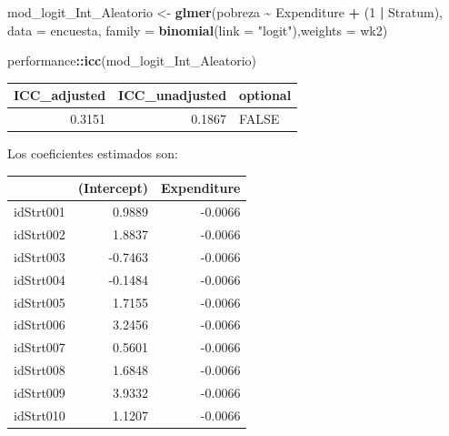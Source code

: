\documentclass[
  spanish,
  12pt,
]{book}
\newenvironment{Shaded}{\begin{snugshade}}{\end{snugshade}}
\newcommand{\AttributeTok}[1]{\textcolor[rgb]{0.13,0.29,0.53}{#1}}
\newcommand{\DataTypeTok}[1]{\textcolor[rgb]{0.13,0.29,0.53}{#1}}
\newcommand{\DecValTok}[1]{\textcolor[rgb]{0.00,0.00,0.81}{#1}}
\newcommand{\FunctionTok}[1]{\textcolor[rgb]{0.13,0.29,0.53}{\textbf{#1}}}
\newcommand{\NormalTok}[1]{#1}
\newcommand{\OtherTok}[1]{\textcolor[rgb]{0.56,0.35,0.01}{#1}}
\newcommand{\SpecialCharTok}[1]{\textcolor[rgb]{0.81,0.36,0.00}{\textbf{#1}}}
\newcommand{\StringTok}[1]{\textcolor[rgb]{0.31,0.60,0.02}{#1}}
\begin{document}
\begin{Shaded}
\begin{Highlighting}[]
\NormalTok{mod\_logit\_Int\_Aleatorio }\OtherTok{\textless{}{-}} \FunctionTok{glmer}\NormalTok{(pobreza }\SpecialCharTok{\textasciitilde{}}\NormalTok{ Expenditure  }\SpecialCharTok{+}\NormalTok{ (}\DecValTok{1} \SpecialCharTok{|}\NormalTok{ Stratum),}
  \AttributeTok{data =}\NormalTok{ encuesta, }\AttributeTok{family =} \FunctionTok{binomial}\NormalTok{(}\AttributeTok{link =} \StringTok{"logit"}\NormalTok{),}\AttributeTok{weights  =}\NormalTok{  wk2)}

\NormalTok{performance}\SpecialCharTok{::}\FunctionTok{icc}\NormalTok{(mod\_logit\_Int\_Aleatorio)}
\end{Highlighting}
\end{Shaded}

\begin{tabular}{r|r|l}
\hline
ICC\_adjusted & ICC\_unadjusted & optional\\
\hline
0.3151 & 0.1867 & FALSE\\
\hline
\end{tabular}

Los coeficientes estimados son:

\begin{Shaded}
\end{Shaded}

\begin{tabular}{l|r|r}
\hline
  & (Intercept) & Expenditure\\
\hline
idStrt001 & 0.9889 & -0.0066\\
\hline
idStrt002 & 1.8837 & -0.0066\\
\hline
idStrt003 & -0.7463 & -0.0066\\
\hline
idStrt004 & -0.1484 & -0.0066\\
\hline
idStrt005 & 1.7155 & -0.0066\\
\hline
idStrt006 & 3.2456 & -0.0066\\
\hline
idStrt007 & 0.5601 & -0.0066\\
\hline
idStrt008 & 1.6848 & -0.0066\\
\hline
idStrt009 & 3.9332 & -0.0066\\
\hline
idStrt010 & 1.1207 & -0.0066\\
\hline
\end{tabular}
\end{document}
